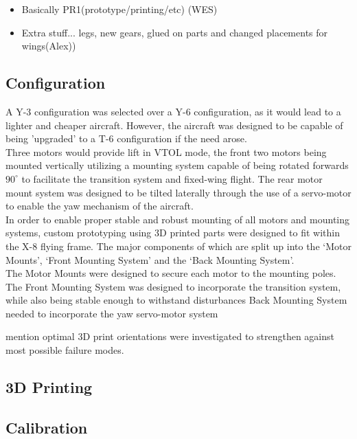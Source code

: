 \color{red}
\begin{itemize}
\item Basically PR1(prototype/printing/etc) (WES)
\item Extra stuff... legs, new gears, glued on parts and changed placements for wings(Alex))
\end{itemize}
\color{black}

\subsection{Configuration}
A Y-3 configuration was selected over a Y-6 configuration, as it would lead to a lighter and cheaper aircraft. However, the aircraft was designed to be capable of being 'upgraded' to a T-6 configuration if the need arose.\\
Three motors would provide lift in VTOL mode, the front two motors being mounted vertically utilizing a mounting system capable of being rotated forwards $90^{\circ}$ to facilitate the transition system and fixed-wing flight. The rear motor mount system was designed to be tilted laterally through the use of a servo-motor to enable the yaw mechanism of the aircraft.\\
In order to enable proper stable and robust mounting of all motors and mounting systems, custom prototyping using 3D printed parts were designed to fit within the X-8 flying frame. The major components of which are split up into the `Motor Mounts', `Front  Mounting System' and the `Back Mounting System'.\\
The Motor Mounts were designed to secure each motor to the mounting poles. 
The Front Mounting System was designed to incorporate the transition system, while also being stable enough to withstand disturbances
Back Mounting System needed to incorporate the yaw servo-motor system

mention optimal 3D print orientations were investigated to strengthen against most possible failure modes.

\subsection{3D Printing}

\subsection{Calibration}
